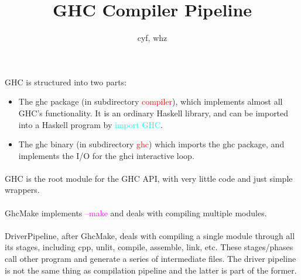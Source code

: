 \documentclass{article}
\author{cyf, whz}
\title{GHC Compiler Pipeline}
\begin{document}
	\maketitle
	\paragraph{}
	GHC is structured into two parts:
	\begin{itemize}
		\item The ghc package (in subdirectory \textcolor{red}{compiler}), which implements almost all GHC's functionality. It is an ordinary Haskell library, and can be imported into a Haskell program by \textcolor{cyan}{import GHC}.
		\item The ghc binary (in subdirectory \textcolor{red}{ghc}) which imports the ghc package, and implements the I/O for the ghci interactive loop.
	\end{itemize}
	\paragraph{}
	GHC is the root module for the GHC API, with very little code and just simple wrappers.
	\paragraph{}
	GhcMake implements \textcolor{magenta}{--make} and deals with compiling multiple modules.
	\paragraph{}
	DriverPipeline, after GhcMake, deals with compiling a single module through all its stages, including cpp, unlit, compile, assemble, link, etc. These stages/phases call other program and generate a series of intermediate files. The driver pipeline is not the same thing as compilation pipeline and the latter is part of the former.
\end{document}
